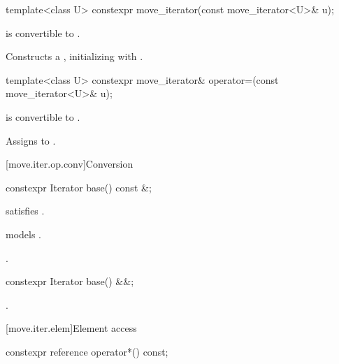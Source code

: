 %
\begin{itemdecl}
template<class U> constexpr move_iterator(const move_iterator<U>& u);
\end{itemdecl}

\begin{itemdescr}
\pnum
\mandates
{} is convertible to .

\pnum
\effects
Constructs a , initializing
 with .
\end{itemdescr}

%
\begin{itemdecl}
template<class U> constexpr move_iterator& operator=(const move_iterator<U>& u);
\end{itemdecl}

\begin{itemdescr}
\pnum
\mandates
{} is convertible to .

\pnum
\effects
Assigns  to
.
\end{itemdescr}

[move.iter.op.conv]{Conversion}

%
\begin{itemdecl}
constexpr Iterator base() const &;
\end{itemdecl}

\begin{itemdescr}
\pnum
\constraints
{} satisfies .

\pnum
\expects
{} models .

\pnum
\returns
{}.
\end{itemdescr}

%
\begin{itemdecl}
constexpr Iterator base() &&;
\end{itemdecl}

\begin{itemdescr}
\pnum
\returns
{}.
\end{itemdescr}

[move.iter.elem]{Element access}

%
\begin{itemdecl}
constexpr reference operator*() const;
\end{itemdecl}

